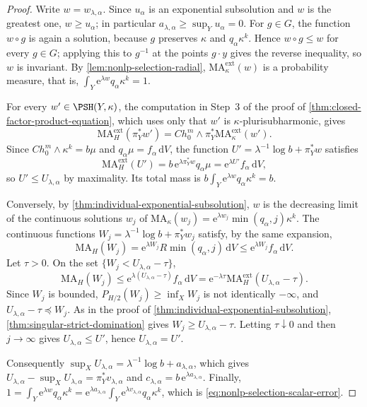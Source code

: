 \begin{proof}
Write $w=w_{\lambda,\alpha}$. Since $u_\alpha$ is an exponential subsolution and $w$ is the greatest one, $w\geq u_\alpha$; in particular $a_{\lambda,\alpha}\geq\sup_Yu_\alpha=0$. For $g\in G$, the function $w\circ g$ is again a solution, because $g$ preserves $\kappa$ and $q_\alpha\kappa^k$. Hence $w\circ g\leq w$ for every $g\in G$; applying this to $g^{-1}$ at the points $g\cdot y$ gives the reverse inequality, so $w$ is invariant. By \cref{lem:nonlp-selection-radial}, $\mathrm{MA}^{\mathrm{ext}}_\kappa(w)$ is a probability measure, that is, $\int_Y\mathrm{e}^{\lambda w}q_\alpha\kappa^k=1$.

For every $w'\in\PSH(Y,\kappa)$, the computation in Step~3 of the proof of \cref{thm:closed-factor-product-equation}, which uses only that $w'$ is $\kappa$-plurisubharmonic, gives
\[
 \mathrm{MA}^{\mathrm{ext}}_H(\pi_Y^*w')=Ch_0^m\wedge\pi_Y^*\mathrm{MA}^{\mathrm{ext}}_\kappa(w').
\]
Since $Ch_0^m\wedge\kappa^k=b\mu$ and $q_\alpha\mu=f_\alpha\,\mathrm{d}V$, the function $U'=\lambda^{-1}\log b+\pi_Y^*w$ satisfies
\[
 \mathrm{MA}^{\mathrm{ext}}_H(U')=b\,\mathrm{e}^{\lambda\pi_Y^*w}q_\alpha\mu=\mathrm{e}^{\lambda U'}f_\alpha\,\mathrm{d}V,
\]
so $U'\leq U_{\lambda,\alpha}$ by maximality. Its total mass is $b\int_Y\mathrm{e}^{\lambda w}q_\alpha\kappa^k=b$.

Conversely, by \cref{thm:individual-exponential-subsolution}, $w$ is the decreasing limit of the continuous solutions $w_j$ of $\mathrm{MA}_\kappa(w_j)=\mathrm{e}^{\lambda w_j}\min(q_\alpha,j)\kappa^k$. The continuous functions $W_j=\lambda^{-1}\log b+\pi_Y^*w_j$ satisfy, by the same expansion,
\[
 \mathrm{MA}_H(W_j)=\mathrm{e}^{\lambda W_j}R\min(q_\alpha,j)\,\mathrm{d}V
 \leq\mathrm{e}^{\lambda W_j}f_\alpha\,\mathrm{d}V.
\]
Let $\tau>0$. On the set $\{W_j<U_{\lambda,\alpha}-\tau\}$,
\[
 \mathrm{MA}_H(W_j)\leq\mathrm{e}^{\lambda(U_{\lambda,\alpha}-\tau)}f_\alpha\,\mathrm{d}V
 =\mathrm{e}^{-\lambda\tau}\mathrm{MA}^{\mathrm{ext}}_H(U_{\lambda,\alpha}-\tau).
\]
Since $W_j$ is bounded, $P_{H/2}(W_j)\geq\inf_XW_j$ is not identically $-\infty$, and $U_{\lambda,\alpha}-\tau\preceq W_j$. As in the proof of \cref{thm:individual-exponential-subsolution}, \cref{thm:singular-strict-domination} gives $W_j\geq U_{\lambda,\alpha}-\tau$. Letting $\tau\downarrow0$ and then $j\to\infty$ gives $U_{\lambda,\alpha}\leq U'$, hence $U_{\lambda,\alpha}=U'$.

Consequently $\sup_XU_{\lambda,\alpha}=\lambda^{-1}\log b+a_{\lambda,\alpha}$, which gives $U_{\lambda,\alpha}-\sup_XU_{\lambda,\alpha}=\pi_Y^*v_{\lambda,\alpha}$ and $c_{\lambda,\alpha}=b\,\mathrm{e}^{\lambda a_{\lambda,\alpha}}$. Finally, $1=\int_Y\mathrm{e}^{\lambda w}q_\alpha\kappa^k=\mathrm{e}^{\lambda a_{\lambda,\alpha}}\int_Y\mathrm{e}^{\lambda v_{\lambda,\alpha}}q_\alpha\kappa^k$, which is \eqref{eq:nonlp-selection-scalar-error}.
\end{proof}

